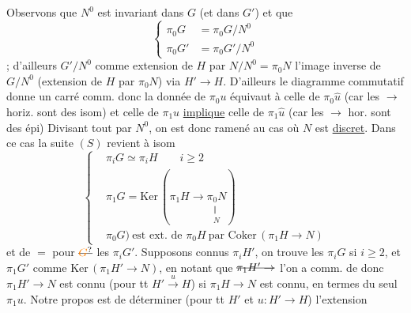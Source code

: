 Observons que $N^0$ est invariant dans $G$ (et dans $G'$) et que
\[
\left\{\begin{aligned}
\pi_0 G&=\pi_0 G/N^0\\
\pi_0 G'&=\pi_0 G'/N^0
\end{aligned}\right.
\]
; d'ailleurs $G'/N^0$ comme extension de $H$ par $N/N^0=\pi_0N$ l'image inverse de $G/N^0$ (extension de $H$ par $\pi_0N$) via $H'\to H$. D'ailleurs le diagramme commutatif
donne un carré comm.
donc la donnée de $\pi_0u$ équivaut à celle de $\pi_0\widehat u$ (car les $\to$ horiz. sont des isom) et celle de $\pi_1u$ \uline{implique} celle de $\pi_1\widehat u$ (car les $\to$ hor. sont des épi)  Divisant tout par $N^0$, on est donc ramené au cas où $N$ est \uline{discret}. Dans ce cas la suite $(S)$ revient à  isom
\[
\left\{\begin{aligned}
&\pi_iG\simeq\pi_iH\qquad i\geq2\\
&\pi_1G=\mathrm{Ker}\,(\pi_1 H\to\underset{\substack{\Vert\\N}}{\pi_0N})\\
&\pi_0G)\ \text{est ext. de }\pi_0H\ \text{par }\mathrm{Coker}\,(\pi_1 H\to N)
\end{aligned}\right.
\]
et de $=$ pour $\deleted{\unsure{G}}$ les $\pi_iG'$.  Supposons connus  $\pi_i H'$, on trouve les $\pi_i G$ si $i\geq2$, et $\pi_1G'$ comme $\mathrm{Ker}\,(\pi_1H'\to N)$, en notant que $\deleted{\pi_1H'\to}$ l'on a comm. de
donc $\pi_1H'\to N$ est connu (pour tt $H'\xrightarrow{u}H$) si $\pi_1H\to N$ est connu, en termes du seul $\pi_1u$. Notre propos est    de déterminer (pour tt $H'$ et $u:H'\to H$) l'extension
